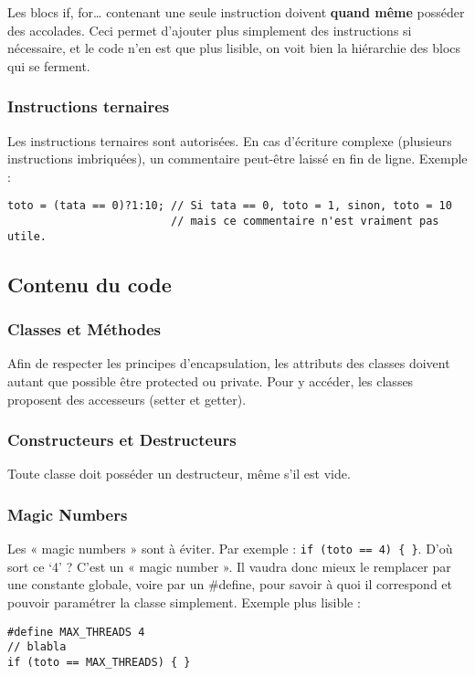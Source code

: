 \begin{note}
  Les blocs if, for… contenant une seule instruction doivent \textbf{quand même} posséder des accolades. Ceci permet d'ajouter plus simplement des instructions si nécessaire, et le code n'en est que plus lisible, on voit bien la hiérarchie des blocs qui se ferment.
\end{note}

\subsubsection{Instructions ternaires}

Les instructions ternaires sont autorisées. En cas d'écriture complexe (plusieurs instructions imbriquées), un commentaire peut-être laissé en fin de ligne. 
Exemple : 
\begin{verbatim}
toto = (tata == 0)?1:10; // Si tata == 0, toto = 1, sinon, toto = 10
                         // mais ce commentaire n'est vraiment pas utile.
\end{verbatim}

\subsection{Contenu du code}

\subsubsection{Classes et Méthodes}

Afin de respecter les principes d'encapsulation, les attributs des classes doivent autant que possible être protected ou private. Pour y accéder, les classes proposent des accesseurs (setter et getter).

\subsubsection{Constructeurs et Destructeurs}

Toute classe doit posséder un destructeur, même s'il est vide.

\subsubsection{Magic Numbers}

Les « magic numbers » sont à éviter. Par exemple : \verb+if (toto == 4) { }+. D'où sort ce `4' ? C'est un « magic number ». Il vaudra donc mieux le remplacer par une constante globale, voire par un \#define, pour savoir à quoi il correspond et pouvoir paramétrer la classe simplement.
Exemple plus lisible :
\begin{verbatim}
#define MAX_THREADS 4
// blabla
if (toto == MAX_THREADS) { } 
\end{verbatim}

